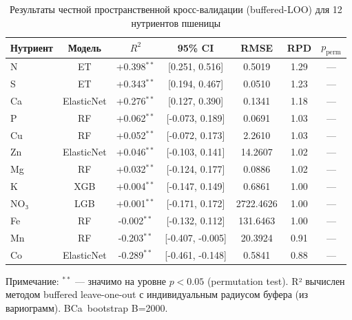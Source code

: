 \begin{table}[H]
\centering
\caption{Результаты честной пространственной кросс-валидации (buffered-LOO) для 12 нутриентов пшеницы}
\label{tab:honest_results}
\begin{tabular}{lcccccc}
\toprule
\textbf{Нутриент} & \textbf{Модель} & \textbf{$R^2$} & \textbf{95\% CI} & \textbf{RMSE} & \textbf{RPD} & \textbf{$p_\text{perm}$} \\
\midrule
  N & ET & +0.398$^{**}$ & [0.251, 0.516] & 0.5019 & 1.29 & --- \\
  S & ET & +0.343$^{**}$ & [0.194, 0.467] & 0.0510 & 1.23 & --- \\
  Ca & ElasticNet & +0.276$^{**}$ & [0.127, 0.390] & 0.1341 & 1.18 & --- \\
  P & RF & +0.062$^{**}$ & [-0.073, 0.189] & 0.0691 & 1.03 & --- \\
  Cu & RF & +0.052$^{**}$ & [-0.072, 0.173] & 2.2610 & 1.03 & --- \\
  Zn & ElasticNet & +0.046$^{**}$ & [-0.103, 0.141] & 14.2607 & 1.02 & --- \\
  Mg & RF & +0.032$^{**}$ & [-0.124, 0.177] & 0.0886 & 1.02 & --- \\
  K & XGB & +0.004$^{**}$ & [-0.147, 0.149] & 0.6861 & 1.00 & --- \\
  NO₃ & LGB & +0.001$^{**}$ & [-0.171, 0.172] & 2722.4626 & 1.00 & --- \\
  Fe & RF & -0.002$^{**}$ & [-0.132, 0.112] & 131.6463 & 1.00 & --- \\
  Mn & RF & -0.203$^{**}$ & [-0.407, -0.005] & 20.3924 & 0.91 & --- \\
  Co & ElasticNet & -0.289$^{**}$ & [-0.461, -0.148] & 0.5841 & 0.88 & --- \\
\bottomrule
\end{tabular}
\footnotesize
\raggedright
Примечание: $^{**}$ — значимо на уровне $p < 0.05$ (permutation test). R² вычислен методом buffered leave-one-out с индивидуальным радиусом буфера (из вариограмм). BCa~bootstrap B=2000.
\end{table}